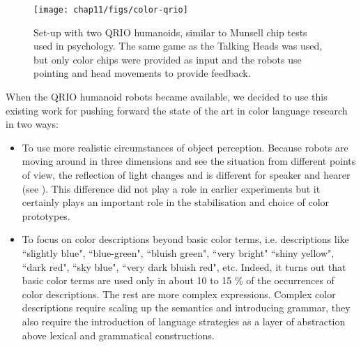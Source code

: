 \begin{figure}[htbp]
  \centerline{\texttt{[image: chap11/figs/color-qrio]}}
\caption{\label{fig:munsell} 
Set-up with two QRIO humanoids, similar to Munsell chip tests used in psychology. The same game as the Talking 
Heads was used, but only color chips were provided as input and the robots use pointing and head movements to 
provide feedback.}
\end{figure}

When the QRIO humanoid robots became available, we decided to use this existing work for pushing forward the state of 
the art in color language research in two ways:
\begin{itemize}
\item To use more realistic circumstances of object perception. Because 
robots are moving around in three dimensions and see the situation from different points of view, the reflection 
of light changes and is different for speaker and hearer (see ). This difference did not 
play a role in earlier experiments but 
it certainly plays an important role in the stabilisation and choice of color prototypes. 
\item To focus on color descriptions beyond basic color terms, i.e. descriptions like 
``slightly blue", ``blue-green", ``bluish green", ``very bright" ``shiny yellow", ``dark red", ``sky blue", 
``very dark bluish red", etc. Indeed, it turns out that 
basic color terms are used only in about 10 to 15 \% of the occurrences of color descriptions. The rest are 
more complex expressions. Complex color descriptions require scaling up the semantics and introducing grammar, they 
also require the introduction of language strategies as a layer of abstraction 
above lexical and grammatical constructions. 
\end{itemize}


